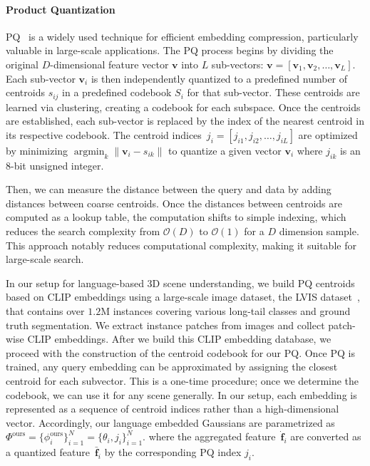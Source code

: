 \paragraph{Product Quantization}
PQ~\cite{product_quantization} is a widely used technique for efficient embedding compression, particularly valuable in large-scale applications.
The PQ process begins by dividing the original $D$-dimensional feature vector $\mathbf{v}$ into $L$ sub-vectors: $\mathbf{v} = [\mathbf{v}_1, \mathbf{v}_2, \ldots, \mathbf{v}_L]$. 
Each sub-vector $\mathbf{v}_i$ is then independently quantized to a predefined number of centroids $s_{ij}$ in a predefined codebook $S_i$ for that sub-vector. These centroids are learned via clustering, creating a codebook for each subspace. Once the centroids are established, each sub-vector is replaced by the index of the nearest centroid in its respective codebook. 
The centroid indices~$j_i = [j_{i1}, j_{i2}, \ldots, j_{iL}]$ are optimized by minimizing $\mathop{\arg\min}_{k} \lVert \mathbf{v}_i - s_{ik} \rVert$ to quantize a given vector $\mathbf{v}_i$ where $j_{ik}$ is an 8-bit unsigned integer. 

Then, we can measure the distance between the query and data by adding distances between coarse centroids. Once the distances between centroids are computed as a lookup table, the computation shifts to simple indexing, which reduces the search complexity from $\mathcal{O}(D)$ to $\mathcal{O}(1)$ for a $D$ dimension sample. This approach notably reduces computational complexity, making it suitable for large-scale search.

In our setup for language-based 3D scene understanding,
we build PQ centroids based on CLIP embeddings using a large-scale image dataset, the LVIS dataset~\cite{lvis_dataset}, that contains over $1.2$M instances covering various long-tail classes and ground truth segmentation. We extract instance patches from images and collect patch-wise CLIP embeddings. After we build this CLIP embedding database, we proceed with the construction of the centroid codebook for our PQ. Once PQ is trained, any query embedding can be approximated by assigning the closest centroid for each subvector. This is a one-time procedure; once we determine the codebook, we can use it for any scene generally.
In our setup, each embedding is represented as a sequence of centroid indices rather than a high-dimensional vector. Accordingly, our language embedded Gaussians are parametrized as $\Phi^\text{ours} = \{ \phi_i^\text{ours} \}_{i=1}^N = \{ \theta_i, j_i \}_{i=1}^N$. where the aggregated feature~$\dot{\mathbf{f}}_i$ are converted as a quantized feature~$\bar{\mathbf{f}}_i$ by the corresponding PQ index $j_i$.



